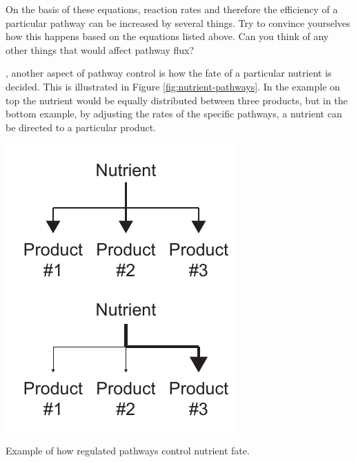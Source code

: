 \documentclass{tufte-handout}
\begin{document}
On the basis of these equations, reaction rates and therefore the efficiency of a particular pathway can be increased by several things.  Try to convince yourselves how this happens based on the equations listed above. Can you think of any other things that would affect pathway flux? 

, another aspect of pathway control is how the fate of a particular nutrient is decided.  This is illustrated in Figure \ref{fig:nutrient-pathways}.  In the example on top the nutrient would be equally distributed between three products, but in the bottom example, by adjusting the rates of the specific pathways, a nutrient can be directed to a particular product.  

\begin{marginfigure}
\includegraphics[width=0.75\marginparwidth]{figures/nutrient-pathways.pdf}\
\caption{Example of how regulated pathways control nutrient fate.}
\label{fig:nutrient-pathways}
\end{marginfigure}
\end{document}
